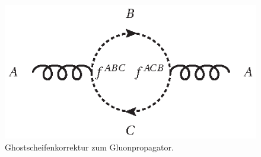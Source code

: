 \begin{figure}[h]
 \centering
 \includegraphics{abschnitte/n-schleifen/fig/QCD4.eps}
 \caption{Ghostscheifenkorrektur zum Gluonpropagator.}\label{fig:n-schleifen:QCD4}
\end{figure}
